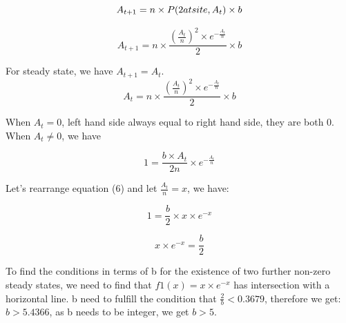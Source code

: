 \documentclass[12pt]{article}
\begin{document}
\begin{equation}
	A_{t+1} = n \times P(2 at site, A_{t}) \times b\\
\end{equation}

\begin{equation}
	A_{t+1} = n \times \frac{(\frac{A_{t}}{n})^{2} \times e^{-\frac{A_{t}}{n}}} {2} \times b
\end{equation}

For steady state, we have $A_{t+1} = A_{t}$.\\

\begin{equation}
	A_{t} = n \times \frac{(\frac{A_{t}}{n})^{2} \times e^{-\frac{A_{t}}{n}}} {2} \times b
\end{equation}

When $A_{t} = 0$, left hand side always equal to right hand side, they are both 0. When $A_{t}  \neq 0$, we have

\begin{equation} \label{eq1}
	1 = \frac{b \times A_{t}}{2n} \times e^{-\frac{A_{t}}{n}}
\end{equation}

Let's rearrange equation (6) and let $\frac{A_{t}}{n} = x $, we have:

\begin{equation}
	1 = \frac{b}{2} \times x \times e^{-x}
\end{equation}

\begin{equation}
	x \times e^{-x} = \frac{b}{2}
\end{equation}

To find the conditions in terms of b for the existence of two further non-zero steady states, we need to find that $f1(x) = x \times e^{-x}$  has intersection with a horizontal line. b need to fulfill the condition that $\frac{2}{b} < 0.3679$, therefore we get: $b > 5.4366$, as b needs to be integer, we get $b > 5$. 
\end{document}
